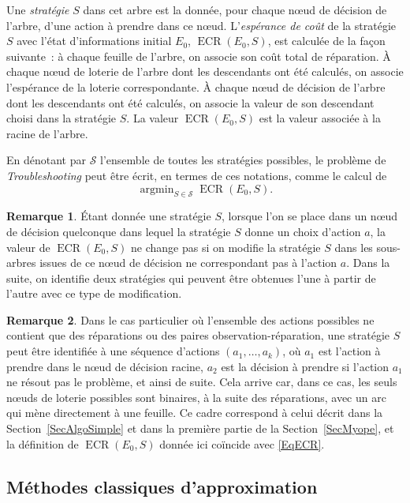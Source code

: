 \documentclass[a4paper,11pt]{article}
\theoremstyle{plain}
\theoremstyle{definition}
\newtheorem*{remk}{Remarque}
\DeclareMathOperator*{\argmin}{argmin}
\DeclareMathOperator{\ECR}{ECR}
\begin{document}
Une \emph{stratégie} $S$ dans cet arbre est la donnée, pour chaque nœud de décision de l'arbre, d'une action à prendre dans ce nœud. L'\emph{espérance de coût} de la stratégie $S$ avec l'état d'informations initial $E_0$, $\ECR(E_0, S)$, est calculée de la façon suivante~: à chaque feuille de l'arbre, on associe son coût total de réparation. À chaque nœud de loterie de l'arbre dont les descendants ont été calculés, on associe l'espérance de la loterie correspondante. À chaque nœud de décision de l'arbre dont les descendants ont été calculés, on associe la valeur de son descendant choisi dans la stratégie $S$. La valeur $\ECR(E_0, S)$ est la valeur associée à la racine de l'arbre.

En dénotant par $\mathcal S$ l'ensemble de toutes les stratégies possibles, le problème de \emph{Troubleshooting} peut être écrit, en termes de ces notations, comme le calcul de
\begin{equation}
\label{MainProblem}
\argmin_{S \in \mathcal S} \ECR(E_0, S).
\end{equation}

\begin{remk}
Étant donnée une stratégie $S$, lorsque l'on se place dans un nœud de décision quelconque dans lequel la stratégie $S$ donne un choix d'action $a$, la valeur de $\ECR(E_0, S)$ ne change pas si on modifie la stratégie $S$ dans les sous-arbres issues de ce nœud de décision ne correspondant pas à l'action $a$. Dans la suite, on identifie deux stratégies qui peuvent être obtenues l'une à partir de l'autre avec ce type de modification.
\end{remk}

\begin{remk}
Dans le cas particulier où l'ensemble des actions possibles ne contient que des réparations ou des paires observation-réparation, une stratégie $S$ peut être identifiée à une séquence d'actions $(a_1, \dotsc, a_k)$, où $a_1$ est l'action à prendre dans le nœud de décision racine, $a_2$ est la décision à prendre si l'action $a_1$ ne résout pas le problème, et ainsi de suite. Cela arrive car, dans ce cas, les seuls nœuds de loterie possibles sont binaires, à la suite des réparations, avec un arc qui mène directement à une feuille. Ce cadre correspond à celui décrit dans la Section~\ref{SecAlgoSimple} et dans la première partie de la Section~\ref{SecMyope}, et la définition de $\ECR(E_0, S)$ donnée ici coïncide avec \eqref{EqECR}.
\end{remk}

\subsection{Méthodes classiques d'approximation}
\end{document}
